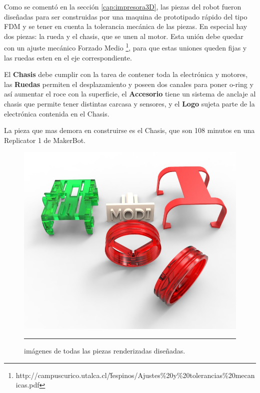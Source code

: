 Como se comentó en la sección \ref{cap:impresora3D}, las piezas del robot fueron diseñadas para ser construidas por una maquina de prototipado rápido del tipo FDM y se tener en cuenta la tolerancia mecánica de las piezas. En especial hay dos piezas: la rueda y el chasis, que se unen al motor. Esta unión debe quedar con un ajuste mecánico Forzado Medio \footnote{http://campuscurico.utalca.cl/\~ fespinos/Ajustes\%20y\%20tolerancias\%20mecanicas.pdf}, para que estas uniones queden fijas y las ruedas esten en el eje correspondiente.

El \textbf{Chasis} debe cumplir con la tarea de contener toda la electrónica y motores, las \textbf{Ruedas} permiten el desplazamiento y poseen dos canales para poner o-ring y así aumentar el roce con la superficie, el \textbf{Accesorio} tiene un sistema de anclaje al chasis que permite tener distintas carcasa y sensores, y el \textbf{Logo} sujeta parte de la electrónica contenida en el Chasis. 

La pieza que mas demora en construirse es el Chasis, que son 108 minutos en una Replicator 1 de MakerBot.

\begin{figure}[htbp]
	\centering
		\includegraphics[width=\textwidth]{./Figures/MODI/piezas.jpg}
		\rule{35em}{0.5pt}
	\caption[Piezas 3D]{imágenes de todas las piezas renderizadas diseñadas.}
	\label{fig:Render Piezas 3D}
\end{figure}



